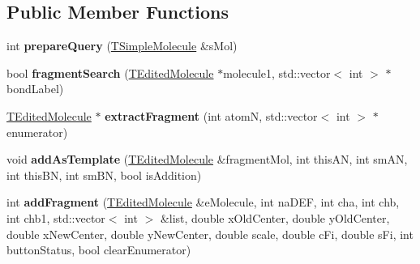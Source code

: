 \subsection*{Public Member Functions}
\begin{DoxyCompactItemize}
\item 
\hypertarget{class_open_babel_1_1_t_edited_molecule_a9e5102ee1100bab17984379730203df3}{int {\bfseries prepare\-Query} (\hyperlink{class_open_babel_1_1_t_simple_molecule}{T\-Simple\-Molecule} \&s\-Mol)}\label{class_open_babel_1_1_t_edited_molecule_a9e5102ee1100bab17984379730203df3}

\item 
\hypertarget{class_open_babel_1_1_t_edited_molecule_a95b094d25d82abf66f27c77fb4480d68}{bool {\bfseries fragment\-Search} (\hyperlink{class_open_babel_1_1_t_edited_molecule}{T\-Edited\-Molecule} $\ast$molecule1, std\-::vector$<$ int $>$ $\ast$bond\-Label)}\label{class_open_babel_1_1_t_edited_molecule_a95b094d25d82abf66f27c77fb4480d68}

\item 
\hypertarget{class_open_babel_1_1_t_edited_molecule_ae5073b8566962e59419296462fcec828}{\hyperlink{class_open_babel_1_1_t_edited_molecule}{T\-Edited\-Molecule} $\ast$ {\bfseries extract\-Fragment} (int atom\-N, std\-::vector$<$ int $>$ $\ast$enumerator)}\label{class_open_babel_1_1_t_edited_molecule_ae5073b8566962e59419296462fcec828}

\item 
\hypertarget{class_open_babel_1_1_t_edited_molecule_abebb68f8fe2090a833ec2aa0280d14a4}{void {\bfseries add\-As\-Template} (\hyperlink{class_open_babel_1_1_t_edited_molecule}{T\-Edited\-Molecule} \&fragment\-Mol, int this\-A\-N, int sm\-A\-N, int this\-B\-N, int sm\-B\-N, bool is\-Addition)}\label{class_open_babel_1_1_t_edited_molecule_abebb68f8fe2090a833ec2aa0280d14a4}

\item 
\hypertarget{class_open_babel_1_1_t_edited_molecule_a1d9541661759c5bbc592d9c827cb90b2}{int {\bfseries add\-Fragment} (\hyperlink{class_open_babel_1_1_t_edited_molecule}{T\-Edited\-Molecule} \&e\-Molecule, int na\-D\-E\-F, int cha, int chb, int chb1, std\-::vector$<$ int $>$ \&list, double x\-Old\-Center, double y\-Old\-Center, double x\-New\-Center, double y\-New\-Center, double scale, double c\-Fi, double s\-Fi, int button\-Status, bool clear\-Enumerator)}\label{class_open_babel_1_1_t_edited_molecule_a1d9541661759c5bbc592d9c827cb90b2}

\end{DoxyCompactItemize}
